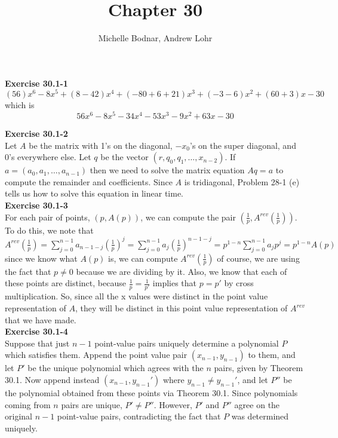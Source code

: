 \documentclass{article}
\title{Chapter 30}
\author{Michelle Bodnar, Andrew Lohr}
\begin{document}
\maketitle
\noindent\textbf{Exercise 30.1-1}\\

\[
(56)x^6 -8x^5 + (8-42)x^4 + (-80 + 6+21)x^3 + (-3-6)x^2 + (60+3)x -30
\]
which is 
\[
56x^6 - 8 x^5 -34x^4 - 53 x^3-9x^2+63x-30
\]

\noindent\textbf{Exercise 30.1-2}\\

Let $A$ be the matrix with 1's on the diagonal, $-x_0$'s on the super diagonal, and 0's everywhere else.  Let $q$ be the vector $(r,q_0,q_1,\ldots,x_{n-2})$. If $a = (a_0,a_1,\ldots,a_{n-1})$ then we need to solve the matrix equation $Aq = a$ to compute the remainder and coefficients.  Since $A$ is tridiagonal, Problem 28-1 (e) tells us how to solve this equation in linear time. \\

\noindent\textbf{Exercise 30.1-3}\\

For each pair of points, $(p,A(p))$, we can compute the pair $(\frac{1}{p}, A^{rev}(\frac{1}{p}))$. To do this, we note that $A^{rev}(\frac{1}{p}) = \sum_{j=0}^{n-1} a_{n-1-j} \left(\frac{1}{p}\right)^j = \sum_{j=0}^{n-1} a_{j} \left( \frac{1}{p}\right)^{n-1-j} = p^{1-n} \sum_{j=0}^{n-1} a_j p^j = p^{1-n} A(p)$ since we know what $A(p)$ is, we can compute $A^{rev}(\frac{1}{p})$ of course, we are using the fact that $p\neq0$ because we are dividing by it. Also, we know that each of these points are distinct, because $\frac{1}{p} = \frac{1}{p'}$  implies that $p=p'$ by cross multiplication. So, since all the x values were distinct in the point value representation of $A$, they will be distinct in this point value representation of $A^{rev}$ that we have made.\\

\noindent\textbf{Exercise 30.1-4}\\

Suppose that just $n-1$ point-value pairs uniquely determine a polynomial $P$ which satisfies them.  Append the point value pair $(x_{n-1},y_{n-1})$ to them, and let $P'$ be the unique polynomial which agrees with the $n$ pairs, given by Theorem 30.1.  Now append instead $(x_{n-1},y_{n-1}')$ where $y_{n-1} \neq y_{n-1}'$, and let $P''$ be the polynomial obtained from these points via Theorem 30.1.  Since polynomials coming from $n$ pairs are unique, $P' \neq P''$.  However, $P'$ and $P''$ agree on the original $n-1$ point-value pairs, contradicting the fact that $P$ was determined uniquely. \\
\end{document}
